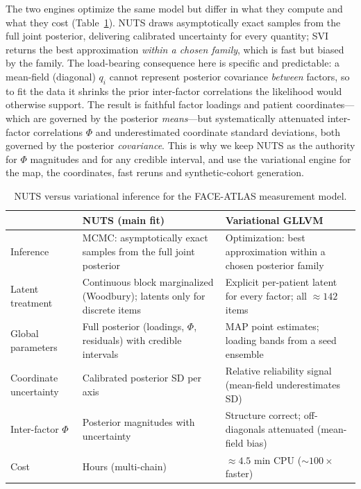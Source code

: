 The two engines optimize the same model but differ in what they compute and what they cost
(Table~\ref{tab:nuts_vs_vi}). NUTS draws asymptotically exact samples from the full joint
posterior, delivering calibrated uncertainty for every quantity; SVI returns the best
approximation \emph{within a chosen family}, which is fast but biased by the family. The
load-bearing consequence here is specific and predictable: a mean-field (diagonal) $q_i$ cannot
represent posterior covariance \emph{between} factors, so to fit the data it shrinks the prior
inter-factor correlations the likelihood would otherwise support. The result is faithful factor
loadings and patient coordinates---which are governed by the posterior \emph{means}---but
systematically attenuated inter-factor correlations $\Phi$ and underestimated coordinate
standard deviations, both governed by the posterior \emph{covariance}. This is why we keep NUTS
as the authority for $\Phi$ magnitudes and for any credible interval, and use the variational
engine for the map, the coordinates, fast reruns and synthetic-cohort generation.

\begin{table}[ht]\centering\small
\caption{NUTS versus variational inference for the FACE-ATLAS measurement model.}
\label{tab:nuts_vs_vi}
\begin{tabular}{@{}p{3.2cm}p{5.4cm}p{5.4cm}@{}}
\toprule
 & \textbf{NUTS (main fit)} & \textbf{Variational GLLVM} \\
\midrule
Inference & MCMC: asymptotically exact samples from the full joint posterior & Optimization: best approximation within a chosen posterior family \\
Latent treatment & Continuous block marginalized (Woodbury); latents only for discrete items & Explicit per-patient latent for every factor; all $\approx142$ items \\
Global parameters & Full posterior (loadings, $\Phi$, residuals) with credible intervals & MAP point estimates; loading bands from a seed ensemble \\
Coordinate uncertainty & Calibrated posterior SD per axis & Relative reliability signal (mean-field underestimates SD) \\
Inter-factor $\Phi$ & Posterior magnitudes with uncertainty & Structure correct; off-diagonals attenuated (mean-field bias) \\
Cost & Hours (multi-chain) & ${\approx}4.5$ min CPU (${\sim}100\times$ faster) \\
\bottomrule
\end{tabular}
\end{table}

